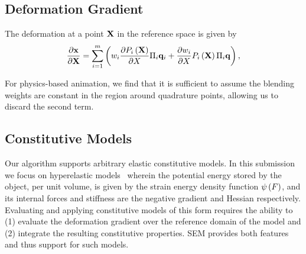 \subsection{Deformation Gradient}
The deformation at a point $\mathbf{X}$ in the reference space is given by
\begin{equation}
    \frac{\partial\mathbf{x}}{\partial \mathbf{X}} = \sum_{i=1}^m\left(w_i\frac{\partial P_i\left(\mathbf{X} \right)}{\partial X}\Pi_i\mathbf{q}_i + \frac{\partial w_i}{\partial X}P_i\left(\mathbf{X} \right)\Pi_i\mathbf{q}\right), 
\end{equation}

For physics-based animation, we find that it is sufficient to assume the blending weights are constant in the region around quadrature points, allowing us to discard the second term.

\subsection{Constitutive Models}
Our algorithm supports arbitrary elastic constitutive models. 
In this submission we focus on hyperelastic models~\cite{10.1145/2343483.2343501} wherein the potential energy stored by the object, per unit volume,
is given by the strain energy density function $\psi\left(F\right)$, and its internal forces and stiffness are the negative gradient and Hessian respectively. 
Evaluating and applying constitutive models of this form requires the ability to (1) evaluate the deformation gradient over the reference domain of the model and 
(2) integrate the resulting constitutive properties. 
SEM provides both features and thus support for such models.

